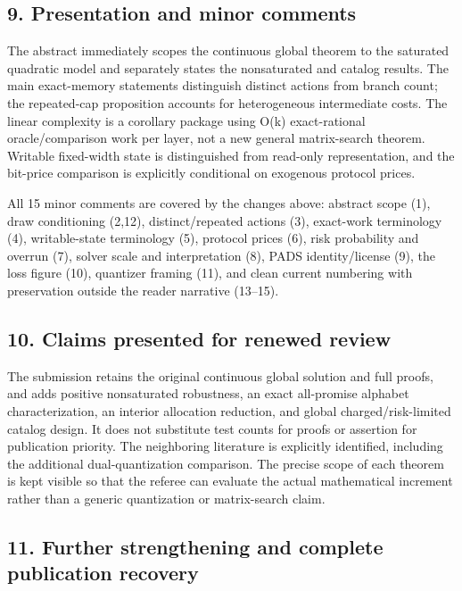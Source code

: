 \documentclass[11pt,letterpaper]{article}
\begin{document}
\subsection*{9. Presentation and minor comments}


The abstract immediately scopes the continuous global theorem to the saturated quadratic model and separately states the nonsaturated and catalog results. The main exact-memory statements distinguish distinct actions from branch count; the repeated-cap proposition accounts for heterogeneous intermediate costs. The linear complexity is a corollary package using O(k) exact-rational oracle/comparison work per layer, not a new general matrix-search theorem. Writable fixed-width state is distinguished from read-only representation, and the bit-price comparison is explicitly conditional on exogenous protocol prices.



All 15 minor comments are covered by the changes above: abstract scope (1), draw conditioning (2,12), distinct/repeated actions (3), exact-work terminology (4), writable-state terminology (5), protocol prices (6), risk probability and overrun (7), solver scale and interpretation (8), PADS identity/license (9), the loss figure (10), quantizer framing (11), and clean current numbering with preservation outside the reader narrative (13–15).



\subsection*{10. Claims presented for renewed review}


The submission retains the original continuous global solution and full proofs, and adds positive nonsaturated robustness, an exact all-promise alphabet characterization, an interior allocation reduction, and global charged/risk-limited catalog design. It does not substitute test counts for proofs or assertion for publication priority. The neighboring literature is explicitly identified, including the additional dual-quantization comparison. The precise scope of each theorem is kept visible so that the referee can evaluate the actual mathematical increment rather than a generic quantization or matrix-search claim.



\subsection*{11. Further strengthening and complete publication recovery}
\end{document}
